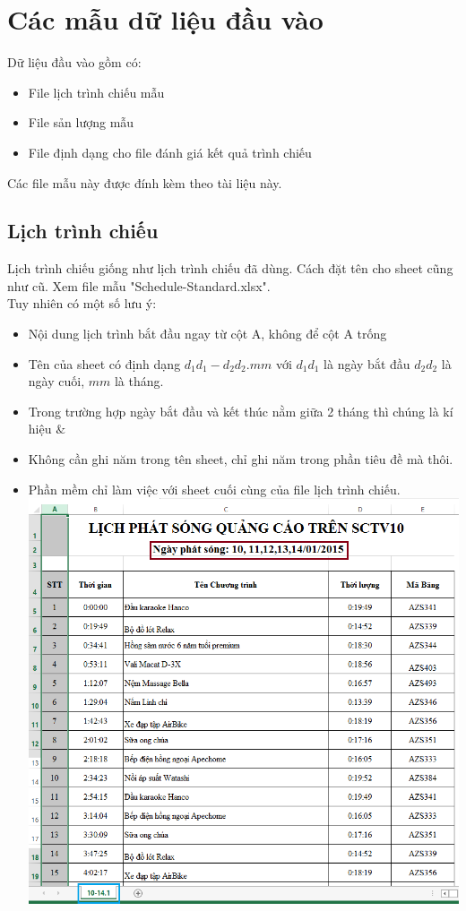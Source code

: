 \documentclass[11pt]{article}
\begin{document}
	\section{Các mẫu dữ liệu đầu vào}
	Dữ liệu đầu vào gồm có:
	\begin{itemize}
		\item File lịch trình chiếu mẫu
		\item File sản lượng mẫu
		\item File định dạng cho file đánh giá kết quả trình chiếu
	\end{itemize}
	Các file mẫu này được đính kèm theo tài liệu này.
	\subsection{Lịch trình chiếu}
	Lịch trình chiếu giống như lịch trình chiếu đã dùng. Cách đặt tên cho sheet cũng như cũ. Xem file mẫu "Schedule-Standard.xlsx".\\
	Tuy nhiên có một số lưu ý:
	\begin{itemize}
		\item Nội dung lịch trình bắt đầu ngay từ cột A, không để cột A trống
		\item Tên của sheet có định dạng $d_{1}d_{1}-d_{2}d_{2}.mm$ với $d_{1}d_{1}$ là ngày bắt đầu $d_{2}d_{2}$ là ngày cuối, $mm$ là tháng.
		\item Trong trường hợp ngày bắt đầu và kết thúc nằm giữa 2 tháng thì chúng là kí hiệu $\&$
		\item Không cần ghi năm trong tên sheet, chỉ ghi năm trong phần tiêu đề mà thôi.
		\item Phần mềm chỉ làm việc với sheet cuối cùng của file lịch trình chiếu.\\
		\includegraphics[width=130mm]{im1.png}
	\end{itemize}
\end{document}
